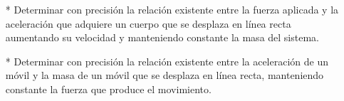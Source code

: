 


\begin{itemize}
    \item[*] Determinar con precisión la relación existente entre la fuerza aplicada y la aceleración que adquiere un cuerpo que se desplaza en línea recta aumentando su velocidad y manteniendo constante la masa del sistema.
    
    \item[*] Determinar con precisión la relación existente entre la aceleración de un móvil y la masa de un móvil que se desplaza en línea recta, manteniendo constante la fuerza que produce el movimiento.
\end{itemize}
